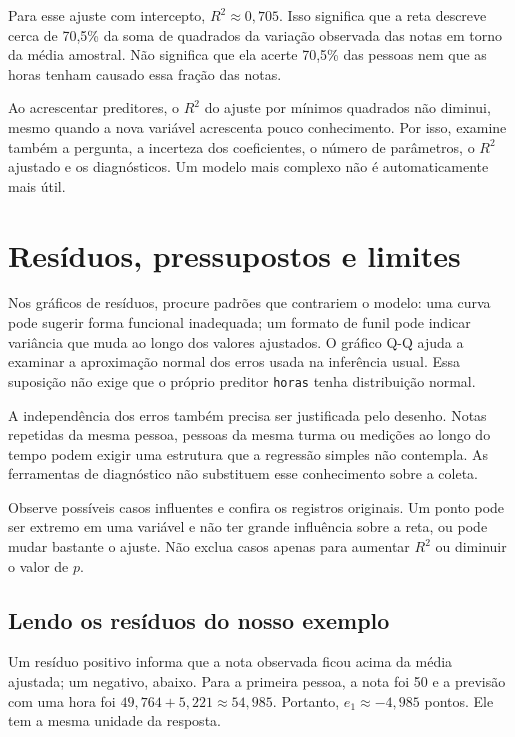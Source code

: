 Para esse ajuste com intercepto, $R^2\approx0{,}705$. Isso significa que a reta descreve cerca de 70,5\% da soma de quadrados da variação observada das notas em torno da média amostral. Não significa que ela acerte 70,5\% das pessoas nem que as horas tenham causado essa fração das notas.

Ao acrescentar preditores, o $R^2$ do ajuste por mínimos quadrados não diminui, mesmo quando a nova variável acrescenta pouco conhecimento. Por isso, examine também a pergunta, a incerteza dos coeficientes, o número de parâmetros, o $R^2$ ajustado e os diagnósticos. Um modelo mais complexo não é automaticamente mais útil.

\section{Resíduos, pressupostos e limites}

Nos gráficos de resíduos, procure padrões que contrariem o modelo: uma curva pode sugerir forma funcional inadequada; um formato de funil pode indicar variância que muda ao longo dos valores ajustados. O gráfico Q-Q ajuda a examinar a aproximação normal dos erros usada na inferência usual. Essa suposição não exige que o próprio preditor \texttt{horas} tenha distribuição normal.

A independência dos erros também precisa ser justificada pelo desenho. Notas repetidas da mesma pessoa, pessoas da mesma turma ou medições ao longo do tempo podem exigir uma estrutura que a regressão simples não contempla. As ferramentas de diagnóstico não substituem esse conhecimento sobre a coleta.

Observe possíveis casos influentes e confira os registros originais. Um ponto pode ser extremo em uma variável e não ter grande influência sobre a reta, ou pode mudar bastante o ajuste. Não exclua casos apenas para aumentar $R^2$ ou diminuir o valor de $p$.


\subsection{Lendo os resíduos do nosso exemplo}

Um resíduo positivo informa que a nota observada ficou acima da média ajustada; um negativo, abaixo. Para a primeira pessoa, a nota foi 50 e a previsão com uma hora foi $49{,}764+5{,}221\approx54{,}985$. Portanto, $e_1\approx-4{,}985$ pontos. Ele tem a mesma unidade da resposta.

